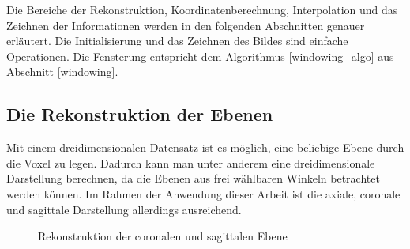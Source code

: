 Die Bereiche der Rekonstruktion, Koordinatenberechnung, Interpolation und das Zeichnen der Informationen werden in den folgenden Abschnitten genauer erläutert. Die Initialisierung und das Zeichnen des Bildes sind einfache Operationen. Die Fensterung entspricht dem Algorithmus \ref{windowing_algo} aus Abschnitt \ref{windowing}.

\FloatBarrier
\subsection{Die Rekonstruktion der Ebenen}

Mit einem dreidimensionalen Datensatz ist es möglich, eine beliebige Ebene durch die Voxel zu legen. Dadurch kann man unter anderem eine dreidimensionale Darstellung berechnen, da die Ebenen aus frei wählbaren Winkeln betrachtet werden können. Im Rahmen der Anwendung dieser Arbeit ist die axiale, coronale und sagittale Darstellung allerdings ausreichend.

\begin{figure}[htb]
\centering
{}
\caption{Rekonstruktion der coronalen und sagittalen Ebene}
\label{mpr}
\end{figure}

